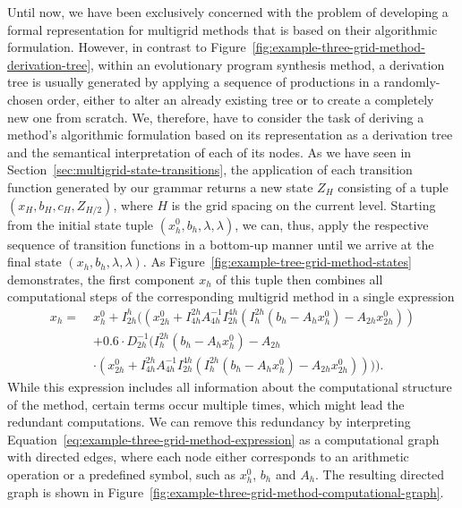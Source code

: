 Until now, we have been exclusively concerned with the problem of developing a formal representation for multigrid methods that is based on their algorithmic formulation.
However, in contrast to Figure~\ref{fig:example-three-grid-method-derivation-tree}, within an evolutionary program synthesis method, a derivation tree is usually generated by applying a sequence of productions in a randomly-chosen order, either to alter an already existing tree or to create a completely new one from scratch.
We, therefore, have to consider the task of deriving a method's algorithmic formulation based on its representation as a derivation tree and the semantical interpretation of each of its nodes.
As we have seen in Section~\ref{sec:multigrid-state-transitions}, the application of each transition function generated by our grammar returns a new state $Z_H$ consisting of a tuple $\left( x_{H}, b_{H}, c_{H}, Z_{H/2}\right)$, where $H$ is the grid spacing on the current level.
Starting from the initial state tuple $\left(x_{h}^0, b_{h}, \lambda, \lambda\right)$, we can, thus, apply the respective sequence of transition functions in a bottom-up manner until we arrive at the final state $\left(x_{h}, b_{h}, \lambda, \lambda\right)$.
As Figure~\ref{fig:example-tree-grid-method-states} demonstrates, the first component $x_{h}$ of this tuple then combines all computational steps of the corresponding multigrid method in a single expression
\begin{equation}\tag{4.7}
	\begin{split}
		x_h = \; & x_{h}^0 + I_{2h}^h ((x_{2h}^0 + I_{4h}^{2h} A_{4h}^{-1} I_{2h}^{4h} (I_{h}^{2h}(b_{h} - A_h x_{h}^0) - A_{2h} x_{2h}^0)) \\
		& + 0.6 \cdot D_{2h}^{-1} (I_{h}^{2h}(b_{h} - A_h x_{h}^0) - A_{2h} \\
		& \cdot (x_{2h}^0 + I_{4h}^{2h} A_{4h}^{-1} I_{2h}^{4h} (I_{h}^{2h}(b_{h} - A_h x_{h}^0) - A_{2h} x_{2h}^0)))).
		\label{eq:example-three-grid-method-expression}
	\end{split}
\end{equation}
While this expression includes all information about the computational structure of the method, certain terms occur multiple times, which might lead the redundant computations.
We can remove this redundancy by interpreting Equation~\eqref{eq:example-three-grid-method-expression} as a computational graph with directed edges, where each node either corresponds to an arithmetic operation or a predefined symbol, such as $x^0_h$, $b_h$ and $A_h$.
The resulting directed graph is shown in Figure~\ref{fig:example-three-grid-method-computational-graph}.
